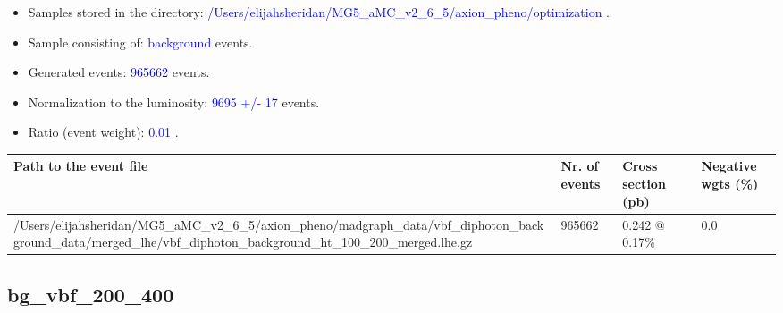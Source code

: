 \documentclass[a4paper, 10pt]{article}
\begin{document}
\begin{itemize}
  \item Samples stored in the directory: \textcolor{blue}{/\-Users/\-elijahsheridan/\-MG5\_aMC\_v2\_6\_5/\-axion\_pheno/\-optimization} .
   \item Sample consisting of: \textcolor{blue}{background}  events.
   \item Generated events: \textcolor{blue}{965662 }  events.
   \item Normalization to the luminosity: \textcolor{blue}{9695}\textcolor{blue}{ +/\-- }\textcolor{blue}{17 }  events.
   \item Ratio (event weight): \textcolor{blue}{0.01 } .  
 
\end{itemize}
\begin{table}[H]
  \begin{center}
    \begin{tabular}{|m{55.0mm}|m{25.0mm}|m{30.0mm}|m{30.0mm}|}
      \hline
      {\cellcolor{yellow}         Path to the event file}& {\cellcolor{yellow}         Nr. of events}& {\cellcolor{yellow}         Cross section (pb)}& {\cellcolor{yellow}         Negative wgts (\%)}\\
      \hline
      {\cellcolor{white}          /\-Users/\-elijahsheridan/\-MG5\_aMC\_v2\_6\_5/\-axion\_pheno/\-madgraph\_data/\-vbf\_diphoton\_background\_data/\-merged\_lhe/\-vbf\_diphoton\_background\_ht\_100\_200\_merged.lhe.gz}& {\cellcolor{white}          965662}& {\cellcolor{white}          0.242 @ 0.17\%}& {\cellcolor{white}          0.0}\\
\hline
    \end{tabular}
  \end{center}
\end{table}

\subsection{ bg\_vbf\_200\_400}
\end{document}
